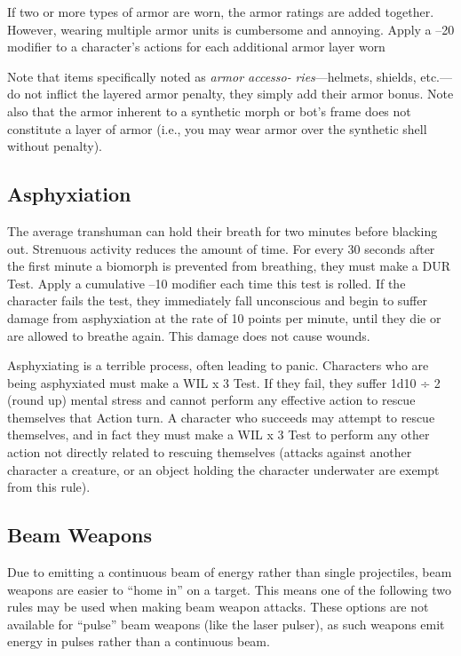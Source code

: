 If two or more types of armor are worn, the armor 
ratings are added together. However, wearing multiple 
armor units is cumbersome and annoying. Apply a –20 
modifier to a character's actions for each additional 
armor layer worn

Note that items specifically noted as \textit{armor accesso-}
\textit{ries}—helmets, shields, etc.—do not inflict the layered 
armor penalty, they simply add their armor bonus. 
Note also that the armor inherent to a synthetic 
morph or bot's frame does not constitute a layer of 
armor (i.e., you may wear armor over the synthetic 
shell without penalty).

\subsection{Asphyxiation}

The average transhuman can hold their breath for 
two minutes before blacking out. Strenuous activity 
reduces the amount of time. For every 30 seconds 
after the first minute a biomorph is prevented from 
breathing, they must make a DUR Test. Apply a cumulative
–10 modifier each time this test is rolled. If
the character fails the test, they immediately fall unconscious
and begin to suffer damage from asphyxiation
at the rate of 10 points per minute, until they
die or are allowed to breathe again. This damage does 
not cause wounds.

Asphyxiating is a terrible process, often leading to 
panic. Characters who are being asphyxiated must 
make a WIL x 3 Test. If they fail, they suffer 1d10 
÷ 2 (round up) mental stress and cannot perform 
any effective action to rescue themselves that Action 
turn. A character who succeeds may attempt to rescue 
themselves, and in fact they must make a WIL x 3 
Test to perform any other action not directly related 
to rescuing themselves (attacks against another character
a creature, or an object holding the character
underwater are exempt from this rule).

\subsection{Beam Weapons}

Due to emitting a continuous beam of energy rather 
than single projectiles, beam weapons are easier to 
``home in'' on a target. This means one of the following
two rules may be used when making beam
weapon attacks. These options are not available for 
``pulse'' beam weapons (like the laser pulser), as such 
weapons emit energy in pulses rather than a continuous
beam.

